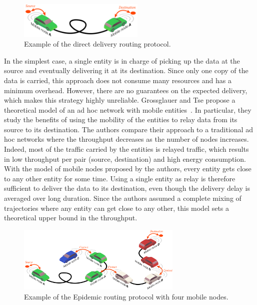 \begin{figure}
    \includegraphics[width=6cm]{figures/direct-delivery.pdf}
    \caption{Example of the direct delivery routing protocol.}
    \label{fig:direct-delivery}
\end{figure}
In the simplest case, a single entity is in charge of picking up the data at the source and eventually delivering it at its destination. Since only one copy of the data is carried, this approach does not consume many resources and has a minimum overhead. However, there are no guarantees on the expected delivery, which makes this strategy highly unreliable. Grossglauer and Tse propose a theoretical model of an ad hoc network with mobile entities~\cite{grossglauser2001mobility}. In particular, they study the benefits of using the mobility of the entities to relay data from its source to its destination. The authors compare their approach to a traditional ad hoc networks where the throughput decreases as the number of nodes increases. Indeed, most of the traffic carried by the entities is relayed traffic, which results in low throughput per pair (source, destination) and high energy consumption. With the model of mobile nodes proposed by the authors, every entity gets close to any other entity for some time. Using a single entity as relay is therefore sufficient to deliver the data to its destination, even though the delivery delay is averaged over long duration. Since the authors assumed a complete mixing of trajectories where any entity can get close to any other, this model sets a theoretical upper bound in the throughput.

\begin{figure}
    \centering
    \includegraphics[width=0.7\textwidth]{figures/epidemic.pdf}
    \caption{Example of the Epidemic routing protocol with four mobile nodes.}
    \label{fig:epidemic-protocol}
\end{figure}

